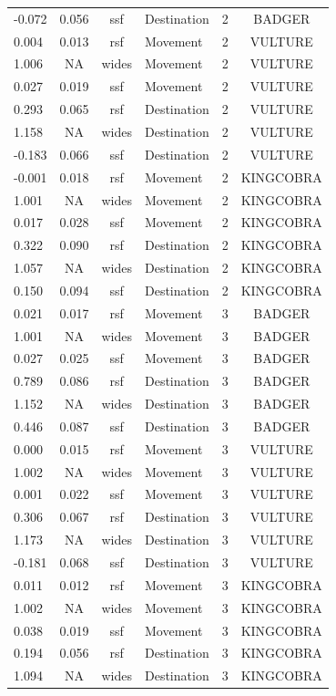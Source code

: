 \documentclass[10pt,a4paper]{article}
\begin{document}
\begin{table}
{\begin{tabular}[t]{lcclcc}
-0.072 & 0.056 & ssf & Destination & 2 & BADGER\\
0.004 & 0.013 & rsf & Movement & 2 & VULTURE\\
1.006 & NA & wides & Movement & 2 & VULTURE\\
0.027 & 0.019 & ssf & Movement & 2 & VULTURE\\
0.293 & 0.065 & rsf & Destination & 2 & VULTURE\\
1.158 & NA & wides & Destination & 2 & VULTURE\\
-0.183 & 0.066 & ssf & Destination & 2 & VULTURE\\
-0.001 & 0.018 & rsf & Movement & 2 & KINGCOBRA\\
1.001 & NA & wides & Movement & 2 & KINGCOBRA\\
0.017 & 0.028 & ssf & Movement & 2 & KINGCOBRA\\
0.322 & 0.090 & rsf & Destination & 2 & KINGCOBRA\\
1.057 & NA & wides & Destination & 2 & KINGCOBRA\\
0.150 & 0.094 & ssf & Destination & 2 & KINGCOBRA\\
0.021 & 0.017 & rsf & Movement & 3 & BADGER\\
1.001 & NA & wides & Movement & 3 & BADGER\\
0.027 & 0.025 & ssf & Movement & 3 & BADGER\\
0.789 & 0.086 & rsf & Destination & 3 & BADGER\\
1.152 & NA & wides & Destination & 3 & BADGER\\
0.446 & 0.087 & ssf & Destination & 3 & BADGER\\
0.000 & 0.015 & rsf & Movement & 3 & VULTURE\\
1.002 & NA & wides & Movement & 3 & VULTURE\\
0.001 & 0.022 & ssf & Movement & 3 & VULTURE\\
0.306 & 0.067 & rsf & Destination & 3 & VULTURE\\
1.173 & NA & wides & Destination & 3 & VULTURE\\
-0.181 & 0.068 & ssf & Destination & 3 & VULTURE\\
0.011 & 0.012 & rsf & Movement & 3 & KINGCOBRA\\
1.002 & NA & wides & Movement & 3 & KINGCOBRA\\
0.038 & 0.019 & ssf & Movement & 3 & KINGCOBRA\\
0.194 & 0.056 & rsf & Destination & 3 & KINGCOBRA\\
1.094 & NA & wides & Destination & 3 & KINGCOBRA\\

\end{tabular}}
\end{table}
\end{document}
